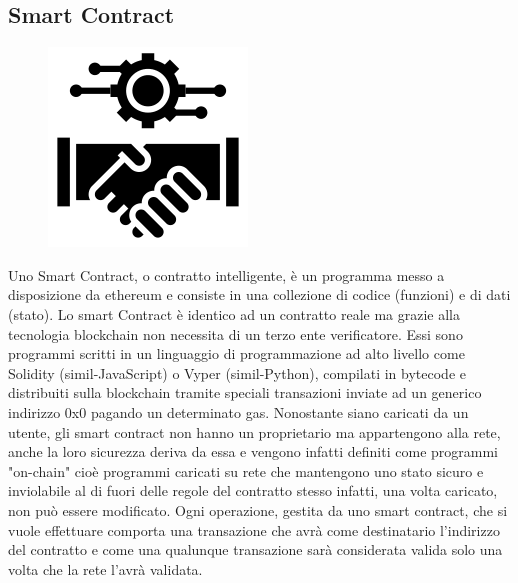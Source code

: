 \documentclass[11pt,a4paper,titlepage,twoside,openright]{report}
\begin{document}
\subsection{Smart Contract}
\begin{figure}
	\includegraphics[height=0.2\textheight]{SmartC}
	\centering
\end{figure}

Uno Smart Contract, o contratto intelligente, è un programma messo a disposizione da ethereum e consiste in una collezione di codice (funzioni) e di dati (stato). Lo smart Contract è identico ad un contratto reale ma grazie alla tecnologia blockchain non necessita di un terzo ente verificatore. Essi sono programmi scritti in un linguaggio di programmazione ad alto livello come Solidity (simil-JavaScript) o Vyper (simil-Python), compilati in bytecode e distribuiti sulla blockchain tramite speciali transazioni inviate ad un generico indirizzo 0x0 pagando un determinato gas. Nonostante siano caricati da un utente, gli smart contract non hanno un proprietario ma appartengono alla rete, anche la loro sicurezza deriva da essa e vengono infatti definiti come programmi "on-chain" cioè programmi caricati su rete che mantengono uno stato sicuro e inviolabile al di fuori delle regole del contratto stesso infatti, una volta caricato, non può essere modificato. Ogni operazione, gestita da uno smart contract, che si vuole effettuare comporta una transazione che avrà come destinatario l'indirizzo del contratto e come una qualunque transazione sarà considerata valida solo una volta che la rete l'avrà validata.
\end{document}
